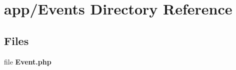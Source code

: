 \section{app/\+Events Directory Reference}
\label{dir_865177c0d5a15c10e4e5d8861434bc36}
\subsection*{Files}
\begin{DoxyCompactItemize}
\item 
file {\bf Event.\+php}
\end{DoxyCompactItemize}
